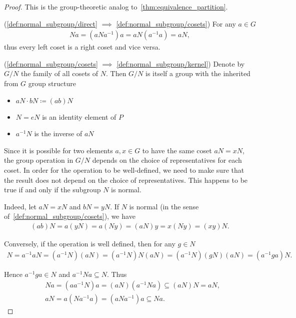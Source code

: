 \begin{proof}
  This is the group-theoretic analog to~\cref{thm:equivalence_partition}.

  (\ref{def:normal_subgroup/direct} \( \implies \) \ref{def:normal_subgroup/cosets}) For any \( a \in G \)
  \begin{align*}
    Na = (aNa^{-1})a = aN(a^{-1}a) = aN,
  \end{align*}
  thus every left coset is a right coset and vice versa.

  (\ref{def:normal_subgroup/cosets} \( \implies \) \ref{def:normal_subgroup/kernel}) Denote by \( G / N \) the family of all cosets of \( N \). Then \( G / N \) is itself a group with the inherited from \( G \) group structure
  \begin{itemize}
    \item \( aN \cdot bN \coloneqq (ab)N \)
    \item \( N = eN \) is an identity element of \( P \)
    \item \( a^{-1} N \) is the inverse of \( aN \)
  \end{itemize}

  Since it is possible for two elements \( a, x \in G \) to have the same coset \( aN = xN \), the group operation in \( G / N \) depends on the choice of representatives for each coset. In order for the operation to be well-defined, we need to make sure that the result does not depend on the choice of representatives. This happens to be true if and only if the subgroup \( N \) is normal.

  Indeed, let \( aN = xN \) and \( bN = yN \). If \( N \) is normal (in the sense of~\ref{def:normal_subgroup/cosets}), we have
  \begin{align*}
    (ab)N = a(yN) = a(Ny) = (aN)y = x(Ny) = (xy)N.
  \end{align*}

  Conversely, if the operation is well defined, then for any \( g \in N \)
  \begin{align*}
    N = a^{-1} a N = (a^{-1} N) (a N) = (a^{-1} N) N (a N) = (a^{-1} N) (g N) (a N) = (a^{-1} g a) N.
  \end{align*}

  Hence \( a^{-1} g a \in N \) and \( a^{-1} N a \subseteq N \). Thus
  \begin{align*}
    &Na = (a a^{-1} N)a = (aN) (a^{-1} N a) \subseteq (aN) N = aN,
    \\
    &aN = a(N a^{-1} a) = (a N a^{-1}) a \subseteq Na.
  \end{align*}


\end{proof}
